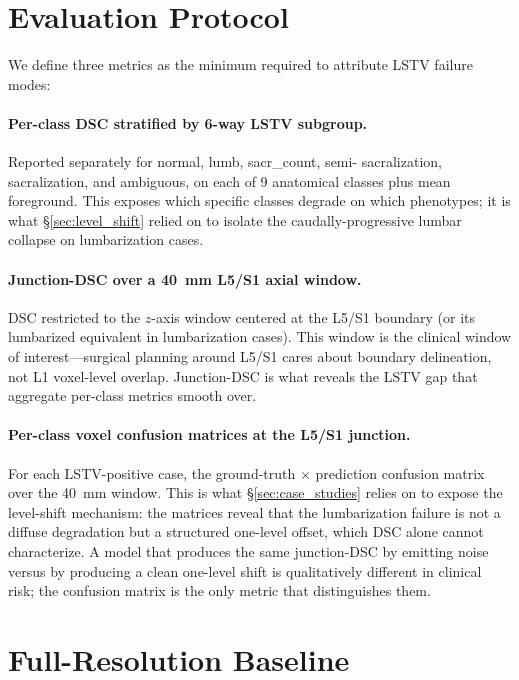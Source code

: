 \documentclass{article}
\begin{document}
\section{Evaluation Protocol}
\label{sec:protocol}

We define three metrics as the minimum required to attribute LSTV
failure modes:

\paragraph{Per-class DSC stratified by 6-way LSTV subgroup.}
Reported separately for normal, lumb, sacr\_count, semi-
sacralization, sacralization, and ambiguous, on each of 9
anatomical classes plus mean foreground.
This exposes which specific classes degrade on which
phenotypes; it is what \S\ref{sec:level_shift} relied on to
isolate the caudally-progressive lumbar collapse on lumbarization
cases.

\paragraph{Junction-DSC over a 40~mm L5/S1 axial window.}
DSC restricted to the $z$-axis window centered at the L5/S1
boundary (or its lumbarized equivalent in lumbarization cases).
This window is the clinical window of interest---surgical planning
around L5/S1 cares about boundary delineation, not L1 voxel-level
overlap.
Junction-DSC is what reveals the LSTV gap that aggregate per-class
metrics smooth over.

\paragraph{Per-class voxel confusion matrices at the L5/S1
junction.}
For each LSTV-positive case, the ground-truth $\times$ prediction
confusion matrix over the 40~mm window.
This is what \S\ref{sec:case_studies} relies on to expose the
level-shift mechanism: the matrices reveal that the lumbarization
failure is not a diffuse degradation but a structured one-level
offset, which DSC alone cannot characterize.
A model that produces the same junction-DSC by emitting noise
versus by producing a clean one-level shift is qualitatively
different in clinical risk; the confusion matrix is the only
metric that distinguishes them.

\section{Full-Resolution Baseline}
\label{sec:baseline}
\end{document}
